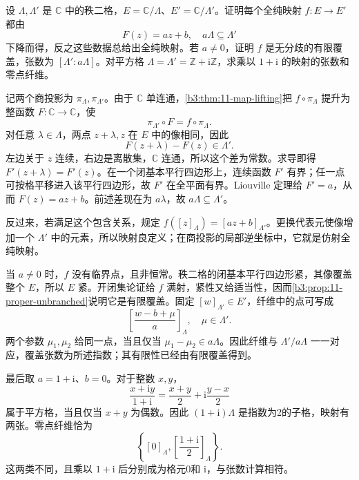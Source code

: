 \begin{exercise}[复环面之间的全纯映射]\label{b3:ex:12-3}
设 \(\Lambda,\Lambda'\) 是 \(\mathbb C\) 中的秩二格，\(E=\mathbb C/\Lambda\)、\(E'=\mathbb C/\Lambda'\)。证明每个全纯映射 \(f:E\rightarrow E'\) 都由
\[
 F(z)=az+b,\quad a\Lambda\subseteq\Lambda'
\]
下降而得，反之这些数据总给出全纯映射。若 \(a\ne0\)，证明 \(f\) 是无分歧的有限覆盖，张数为 \([\Lambda':a\Lambda]\)。对平方格 \(\Lambda=\Lambda'=\mathbb Z+\mathrm i\mathbb Z\)，求乘以 \(1+\mathrm i\) 的映射的张数和零点纤维。
\end{exercise}
\begin{solution}
记两个商投影为 \(\pi_\Lambda,\pi_{\Lambda'}\)。由于 \(\mathbb C\) 单连通，\cref{b3:thm:11-map-lifting}把 \(f\circ\pi_\Lambda\) 提升为整函数 \(F:\mathbb C\rightarrow\mathbb C\)，使
\[
 \pi_{\Lambda'}\circ F=f\circ\pi_\Lambda.
\]
对任意 \(\lambda\in\Lambda\)，两点 \(z+\lambda,z\) 在 \(E\) 中的像相同，因此
\[
 F(z+\lambda)-F(z)\in\Lambda'.
\]
左边关于 \(z\) 连续，右边是离散集，\(\mathbb C\) 连通，所以这个差为常数。求导即得 \(F'(z+\lambda)=F'(z)\)。在一个闭基本平行四边形上，连续函数 \(F'\) 有界；任一点可按格平移进入该平行四边形，故 \(F'\) 在全平面有界。Liouville 定理给 \(F'=a\)，从而 \(F(z)=az+b\)。前述差现在为 \(a\lambda\)，故 \(a\Lambda\subseteq\Lambda'\)。

反过来，若满足这个包含关系，规定 \(f([z]_\Lambda)=[az+b]_{\Lambda'}\)。更换代表元使像增加一个 \(\Lambda'\) 中的元素，所以映射良定义；在商投影的局部逆坐标中，它就是仿射全纯映射。

当 \(a\ne0\) 时，\(f\) 没有临界点，且非恒常。秩二格的闭基本平行四边形紧，其像覆盖整个 \(E\)，所以 \(E\) 紧。开闭集论证给 \(f\) 满射，紧性又给适当性，因而\cref{b3:prop:11-proper-unbranched}说明它是有限覆盖。固定 \([w]_{\Lambda'}\in E'\)，纤维中的点可写成
\[
 \left[\frac{w-b+\mu}{a}\right]_\Lambda,\quad\mu\in\Lambda'.
\]
两个参数 \(\mu_1,\mu_2\) 给同一点，当且仅当 \(\mu_1-\mu_2\in a\Lambda\)。因此纤维与 \(\Lambda'/a\Lambda\) 一一对应，覆盖张数为所述指数；其有限性已经由有限覆盖得到。

最后取 \(a=1+\mathrm i\)、\(b=0\)。对于整数 \(x,y\)，
\[
 \frac{x+\mathrm i y}{1+\mathrm i}=\frac{x+y}{2}+\mathrm i\frac{y-x}{2}
\]
属于平方格，当且仅当 \(x+y\) 为偶数。因此 \((1+\mathrm i)\Lambda\) 是指数为2的子格，映射有两张。零点纤维恰为
\[
 \left\{[0]_\Lambda,\left[\frac{1+\mathrm i}{2}\right]_\Lambda\right\}.
\]
这两类不同，且乘以 \(1+\mathrm i\) 后分别成为格元0和 \(\mathrm i\)，与张数计算相符。
\end{solution}


